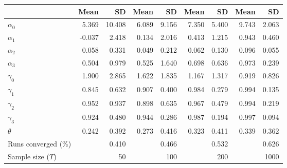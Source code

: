 
\begin{tabular}[t]{lrrrrrrrr}
\toprule
  & Mean & SD & Mean  & SD  & Mean   & SD   & Mean    & SD   \\
\midrule
$\alpha_{0}$ & 5.369 & 10.408 & 6.089 & 9.156 & 7.350 & 5.400 & 9.743 & 2.063\\
$\alpha_{1}$ & -0.037 & 2.418 & 0.134 & 2.016 & 0.413 & 1.215 & 0.943 & 0.460\\
$\alpha_{2}$ & 0.058 & 0.331 & 0.049 & 0.212 & 0.062 & 0.130 & 0.096 & 0.055\\
$\alpha_{3}$ & 0.504 & 0.979 & 0.525 & 1.640 & 0.698 & 0.636 & 0.973 & 0.239\\
$\gamma_{0}$ & 1.900 & 2.865 & 1.622 & 1.835 & 1.167 & 1.317 & 0.919 & 0.826\\
$\gamma_{1}$ & 0.845 & 0.632 & 0.907 & 0.400 & 0.984 & 0.279 & 0.994 & 0.135\\
$\gamma_{2}$ & 0.952 & 0.937 & 0.898 & 0.635 & 0.967 & 0.479 & 0.994 & 0.219\\
$\gamma_{3}$ & 0.924 & 0.480 & 0.944 & 0.286 & 0.987 & 0.194 & 0.997 & 0.094\\
$\theta$ & 0.242 & 0.392 & 0.273 & 0.416 & 0.323 & 0.411 & 0.339 & 0.362\\
Runs converged (\%) &  & 0.410 &  & 0.466 &  & 0.532 &  & 0.626\\
Sample size ($T$) &  & 50 &  & 100 &  & 200 &  & 1000\\
\bottomrule
\end{tabular}

